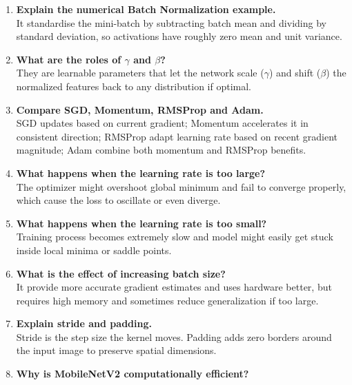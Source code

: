 \documentclass[10pt]{article}
\begin{document}
\begin{enumerate}
It normalizes inputs of layers to reduce internal covariate shift, which stabilize the learning dynamic and speed up training.
\vspace{2mm}
\item \textbf{Explain the numerical Batch Normalization example.} \\
It standardise the mini-batch by subtracting batch mean and dividing by standard deviation, so activations have roughly zero mean and unit variance.
\vspace{2mm}
\item \textbf{What are the roles of $\gamma$ and $\beta$?} \\
They are learnable parameters that let the network scale ($\gamma$) and shift ($\beta$) the normalized features back to any distribution if optimal.
\vspace{2mm}
\item \textbf{Compare SGD, Momentum, RMSProp and Adam.} \\
SGD updates based on current gradient; Momentum accelerates it in consistent direction; RMSProp adapt learning rate based on recent gradient magnitude; Adam combine both momentum and RMSProp benefits.
\vspace{2mm}
\item \textbf{What happens when the learning rate is too large?} \\
The optimizer might overshoot global minimum and fail to converge properly, which cause the loss to oscillate or even diverge.
\vspace{2mm}
\item \textbf{What happens when the learning rate is too small?} \\
Training process becomes extremely slow and model might easily get stuck inside local minima or saddle points.
\vspace{2mm}
\item \textbf{What is the effect of increasing batch size?} \\
It provide more accurate gradient estimates and uses hardware better, but requires high memory and sometimes reduce generalization if too large.
\vspace{2mm}
\item \textbf{Explain stride and padding.} \\
Stride is the step size the kernel moves. Padding adds zero borders around the input image to preserve spatial dimensions.
\vspace{2mm}
\item \textbf{Why is MobileNetV2 computationally efficient?} \\

\end{enumerate}
\end{document}
